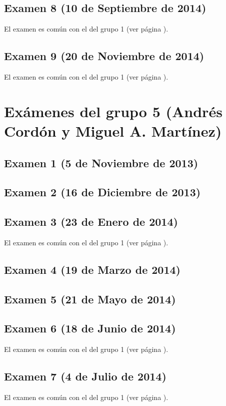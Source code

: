 \documentclass[a4paper,12pt,twoside]{book}
\begin{document}
\subsection{Examen 8 (10 de Septiembre de 2014)}
El examen es común con el del grupo 1 (ver página \pageref{examen_13_14_3_8}).
\subsection{Examen 9 (20 de Noviembre de 2014)}
El examen es común con el del grupo 1 (ver página \pageref{examen_13_14_3_9}).

\section{Exámenes del grupo 5 (Andrés Cordón y Miguel A. Martínez)}
\subsection{Examen 1 (5 de Noviembre de 2013)}
\subsection{Examen 2 (16 de Diciembre de 2013)}
\subsection{Examen 3 (23 de Enero de 2014)}
El examen es común con el del grupo 1 (ver página \pageref{examen_13_14_1_3}).
\subsection{Examen 4 (19 de Marzo de 2014)}
\subsection{Examen 5 (21 de Mayo de 2014)}
\subsection{Examen 6 (18 de Junio de 2014)}
El examen es común con el del grupo 1 (ver página \pageref{examen_13_14_1_6}).
\subsection{Examen 7 (4 de Julio de 2014)}
El examen es común con el del grupo 1 (ver página \pageref{examen_13_14_3_7}).
\end{document}

